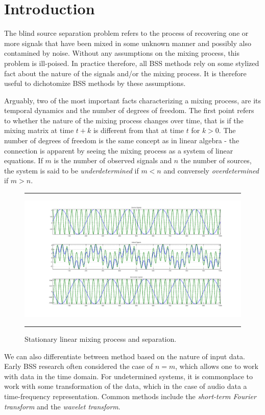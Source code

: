 \section{Introduction}

The blind source separation problem refers to the process of
recovering one or more signals that have been mixed in some unknown
manner and possibly also contamined by noise. Without any assumptions
on the mixing process, this problem is ill-poised. In practice
therefore, all BSS methods rely on some stylized fact about the nature
of the signals and/or the mixing process. It is therefore useful to
dichotomize BSS methods by these assumptions.


Arguably, two of the most important facts characterizing a mixing
process, are its temporal dynamics and the number of degrees of
freedom. The first point refers to whether the nature of the mixing
process changes over time, that is if the mixing matrix at time $t+k$
is different from that at time $t$ for $k>0$. The number of degrees of
freedom is the same concept as in linear algebra - the connection is
apparent by seeing the mixing process as a system of linear
equations. If $m$ is the number of observed signals and $n$ the number
of sources, the system is said to be \emph{underdetermined} if $m<n$
and conversely \emph{overdetermined} if $m>n$. 

\begin{figure}
  \centering
  \hrule
  \includegraphics[width = .9\textwidth]{ica_simple}
  \hrule
  \caption{Stationary linear mixing process and separation.}
  \label{pca_time_series}
\end{figure}

We can also differentiate between method based on the nature of input
data. Early BSS research often considered the case of $n=m$, which
allows one to work with data in the time domain. For undetermined
systems, it is commonplace to work with some transformation of the
data, which in the case of audio data a time-frequency
representation. Common methods include the \emph{short-term Fourier
  transform} and the \emph{wavelet transform}.



